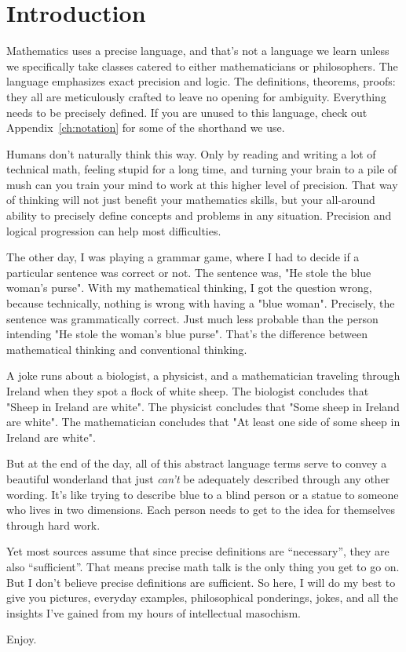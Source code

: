 \chapter{Introduction}

Mathematics uses a precise language, and that's not a language we learn unless we specifically take classes catered to either mathematicians or philosophers.  The language emphasizes exact precision and logic.  The definitions, theorems, proofs: they all are meticulously crafted to leave no opening for ambiguity.  Everything needs to be precisely defined.  If you are unused to this language, check out Appendix~\ref{ch:notation} for some of the shorthand we use.

Humans don't naturally think this way.  Only by reading and writing a lot of technical math, feeling stupid for a long time, and turning your brain to a pile of mush can you train your mind to work at this higher level of precision.  That way of thinking will not just benefit your mathematics skills, but your all-around ability to precisely define concepts and problems in any situation.  Precision and logical progression can help most difficulties.

The other day, I was playing a grammar game, where I had to decide if a particular sentence was correct or not.  The sentence was, "He stole the blue woman's purse".  With my mathematical thinking, I got the question wrong, because technically, nothing is wrong with having a "blue woman".  Precisely, the sentence was grammatically correct.  Just much less probable than the person intending "He stole the woman's blue purse".  That's the difference between mathematical thinking and conventional thinking.

A joke runs about a biologist, a physicist, and a mathematician traveling through Ireland when they spot a flock of white sheep.  The biologist concludes that "Sheep in Ireland are white".  The physicist concludes that "Some sheep in Ireland are white".  The mathematician concludes that "At least one side of some sheep in Ireland are white".

But at the end of the day, all of this abstract language terms serve to convey a beautiful wonderland that just \textit{can't} be adequately described through any other wording.  It's like trying to describe blue to a blind person or a statue to someone who lives in two dimensions.  Each person needs to get to the idea for themselves through hard work.

Yet most sources assume that since precise definitions are ``necessary'', they are also ``sufficient''.  That means precise math talk is the only thing you get to go on. But I don't believe precise definitions are sufficient. So here, I will do my best to give you pictures, everyday examples, philosophical ponderings, jokes, and all the insights I've gained from my hours of intellectual masochism.

Enjoy.
